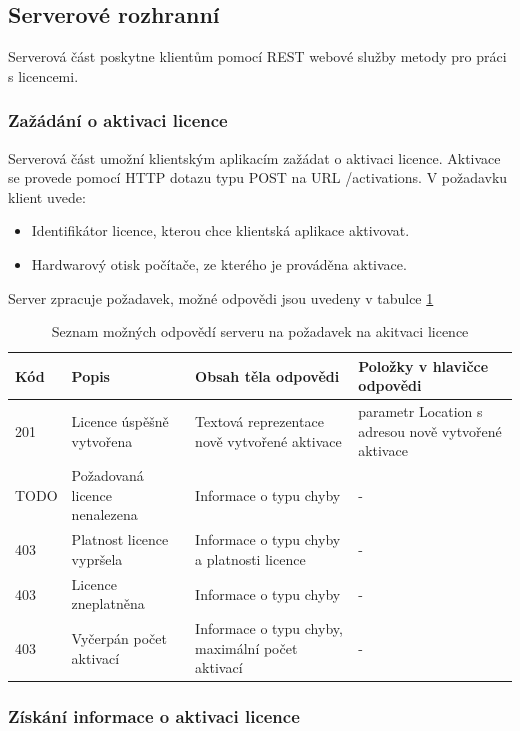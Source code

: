 \subsection{Serverové rozhranní}

Serverová část poskytne klientům pomocí \gls{REST} webové služby metody pro
práci s licencemi.

\subsubsection*{Zažádání o aktivaci licence}

Serverová část umožní klientským aplikacím zažádat o aktivaci licence. Aktivace
se provede pomocí \gls{HTTP} dotazu typu POST na \gls{URL} /activations. V
požadavku klient uvede:

\begin{itemize}
  \item Identifikátor licence, kterou chce klientská aplikace aktivovat.
  \item Hardwarový otisk počítače, ze kterého je prováděna aktivace.
\end{itemize}

Server zpracuje požadavek, možné odpovědi jsou uvedeny v tabulce \ref{tab:license-request-responses} 

\begin{table}\centering
	\caption[Results]{Seznam možných odpovědí
	serveru na požadavek na akitvaci licence}\label{tab:license-request-responses}
	\begin{tabular}{|p{1cm}|p{3cm}|p{4cm}|p{3cm}|}\hline 
	Kód		&  Popis	& Obsah těla odpovědi & Položky v hlavičce odpovědi
	\tabularnewline \hline \hline 
	201		& Licence úspěšně vytvořena	& Textová reprezentace nově vytvořené aktivace
	& parametr Location s adresou nově vytvořené aktivace
	\tabularnewline \hline
	TODO	& Požadovaná licence nenalezena & Informace o typu chyby & -
	\tabularnewline \hline
	403		& Platnost licence vypršela & Informace o typu chyby a platnosti licence &
	-
	\tabularnewline \hline
	403		& Licence zneplatněna	& Informace o typu chyby & -
	\tabularnewline \hline
	403 	& Vyčerpán počet aktivací & Informace o typu chyby, maximální počet
	aktivací & -
	 \tabularnewline \hline
	\end{tabular}
\end{table}

\subsubsection*{Získání informace o aktivaci licence}

